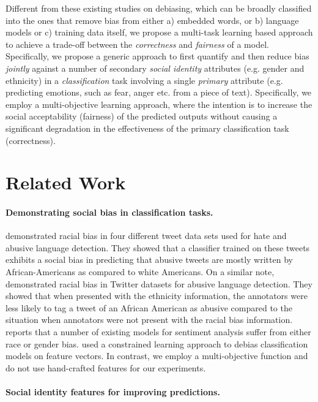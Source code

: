 \documentclass[letterpaper]{article}
\begin{document}
Different from these existing studies on debiasing,
which can be broadly classified into the ones that remove bias from either a) embedded words, or b) language models or c) training data itself,
we propose a multi-task learning based approach to achieve a trade-off between the \emph{correctness} and \emph{fairness} of a model. Specifically, we propose a generic approach to first quantify and then reduce bias \emph{jointly} against a number of secondary \emph{social identity} attributes (e.g. gender and ethnicity) in a \emph{classification} task involving a single \emph{primary} attribute (e.g. predicting emotions, such as fear, anger etc. from a piece of text). Specifically, we employ a multi-objective learning approach, where the intention is to increase the social acceptability (fairness) of the predicted outputs without causing a significant degradation in the effectiveness of the primary classification task (correctness).


\section{Related Work}

\paragraph{Demonstrating social bias in classification tasks.}

\citet{davidson-etal-2019} demonstrated racial bias in four different tweet data sets used for hate and abusive language detection. They showed that a classifier trained on these tweets
exhibits a social bias in predicting that abusive tweets are
mostly written by African-Americans as compared to white Americans.
On a similar note, \citet{sap-etal-2019} demonstrated racial bias in Twitter datasets for abusive language detection. 
They showed that when presented with the ethnicity information, the annotators were less likely to tag a tweet of an African American as abusive compared to the situation when annotators were not present with the racial bias information. 
\citet{kiritchenko-mohammad-2018-examining} reports that a number of existing models for sentiment analysis suffer from either race or gender bias.
\citet{Zafar:2017} used a constrained learning approach to debias classification models on feature vectors.
In contrast, we employ a multi-objective function and do not use hand-crafted features for our experiments.

\paragraph{Social identity features for improving predictions.}
\end{document}
